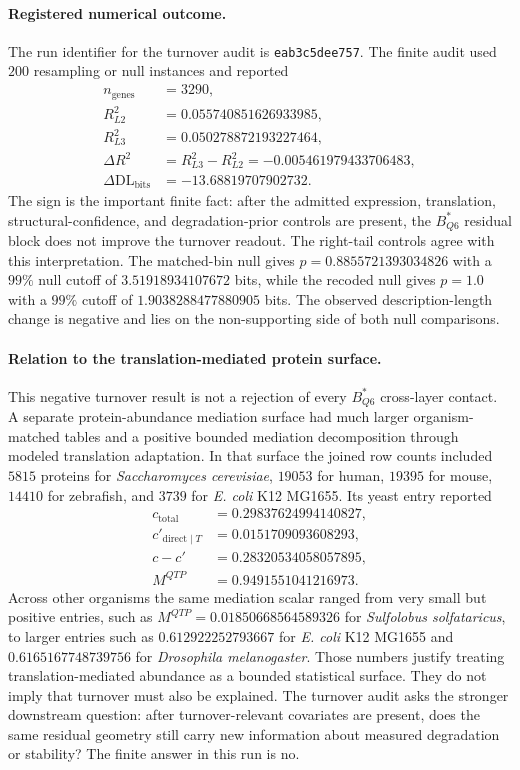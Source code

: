 \paragraph{Registered numerical outcome.}
The run identifier for the turnover audit is \texttt{eab3c5dee757}. The finite audit used $200$ resampling or null instances and reported
$$
\begin{aligned}
  n_{\mathrm{genes}} &= 3290,\\
  R^2_{L2} &= 0.055740851626933985,\\
  R^2_{L3} &= 0.050278872193227464,\\
  \Delta R^2 &= R^2_{L3}-R^2_{L2} = -0.005461979433706483,\\
  \Delta \mathrm{DL}_{\mathrm{bits}} &= -13.68819707902732.
\end{aligned}
$$
The sign is the important finite fact: after the admitted expression, translation, structural-confidence, and degradation-prior controls are present, the $B^{\ast}_{Q6}$ residual block does not improve the turnover readout. The right-tail controls agree with this interpretation. The matched-bin null gives $p=0.8855721393034826$ with a $99\%$ null cutoff of $3.51918934107672$ bits, while the recoded null gives $p=1.0$ with a $99\%$ cutoff of $1.9038288477880905$ bits. The observed description-length change is negative and lies on the non-supporting side of both null comparisons.

\paragraph{Relation to the translation-mediated protein surface.}
This negative turnover result is not a rejection of every $B^{\ast}_{Q6}$ cross-layer contact. A separate protein-abundance mediation surface had much larger organism-matched tables and a positive bounded mediation decomposition through modeled translation adaptation. In that surface the joined row counts included $5815$ proteins for \emph{Saccharomyces cerevisiae}, $19053$ for human, $19395$ for mouse, $14410$ for zebrafish, and $3739$ for \emph{E. coli} K12 MG1655. Its yeast entry reported
$$
\begin{aligned}
  c_{\mathrm{total}} &= 0.29837624994140827,\\
  c'_{\mathrm{direct}\mid T} &= 0.0151709093608293,\\
  c-c' &= 0.28320534058057895,\\
  M^{QTP} &= 0.9491551041216973.
\end{aligned}
$$
Across other organisms the same mediation scalar ranged from very small but positive entries, such as $M^{QTP}=0.01850668564589326$ for \emph{Sulfolobus solfataricus}, to larger entries such as $0.612922252793667$ for \emph{E. coli} K12 MG1655 and $0.6165167748739756$ for \emph{Drosophila melanogaster}. Those numbers justify treating translation-mediated abundance as a bounded statistical surface. They do not imply that turnover must also be explained. The turnover audit asks the stronger downstream question: after turnover-relevant covariates are present, does the same residual geometry still carry new information about measured degradation or stability? The finite answer in this run is no.

